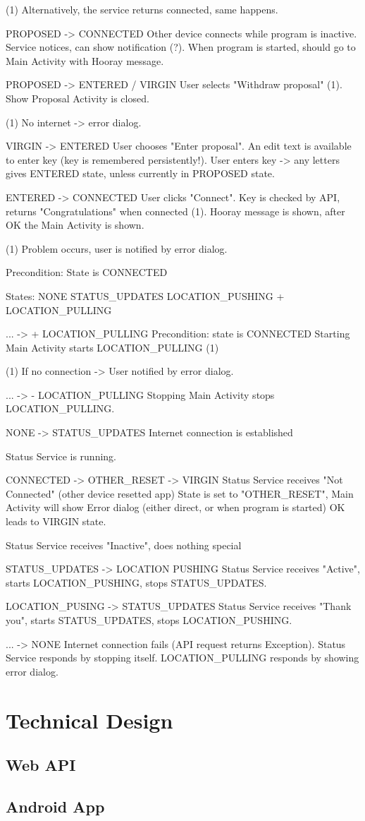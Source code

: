 \documentclass[a4paper,12pt]{article}
\begin{document}
    (1) Alternatively, the service returns connected, same happens.
    
    PROPOSED -> CONNECTED
    Other device connects while program is inactive.
    Service notices, can show notification (?).
    When program is started, should go to Main Activity with Hooray message.
  
    PROPOSED -> ENTERED / VIRGIN
    User selects "Withdraw proposal" (1).
    Show Proposal Activity is closed.
    
    (1) No internet -> error dialog.
    
  VIRGIN -> ENTERED
  User chooses "Enter proposal".
  An edit text is available to enter key (key is remembered persistently!).
  User enters key -> any letters gives ENTERED state, unless currently in
  PROPOSED state.
  
  ENTERED -> CONNECTED
  User clicks "Connect".
  Key is checked by API, returns "Congratulations" when connected (1).
  Hooray message is shown, after OK the Main Activity is shown.
  
  (1) Problem occurs, user is notified by error dialog.
  

Precondition: State is CONNECTED

States:
NONE
STATUS_UPDATES
LOCATION_PUSHING
+ LOCATION_PULLING

... -> + LOCATION_PULLING
Precondition: state is CONNECTED
Starting Main Activity starts LOCATION_PULLING (1)

(1) If no connection -> User notified by error dialog.

... -> - LOCATION_PULLING
Stopping Main Activity stops LOCATION_PULLING.

NONE -> STATUS_UPDATES
Internet connection is established

Status Service is running.

CONNECTED -> OTHER_RESET -> VIRGIN
Status Service receives "Not Connected" (other device resetted app)
State is set to "OTHER_RESET", Main Activity will show Error dialog (either
direct, or when program is started)
OK leads to VIRGIN state.

Status Service receives "Inactive", does nothing special

STATUS_UPDATES -> LOCATION PUSHING
Status Service receives "Active", starts LOCATION_PUSHING, stops
STATUS_UPDATES.

LOCATION_PUSING -> STATUS_UPDATES
Status Service receives "Thank you", starts STATUS_UPDATES, stops
LOCATION_PUSHING.

... -> NONE
Internet connection fails (API request returns Exception).
Status Service responds by stopping itself.
LOCATION_PULLING responds by showing error dialog.


\section{Technical Design}
\subsection{Web API}
\subsection{Android App}
\end{document}
